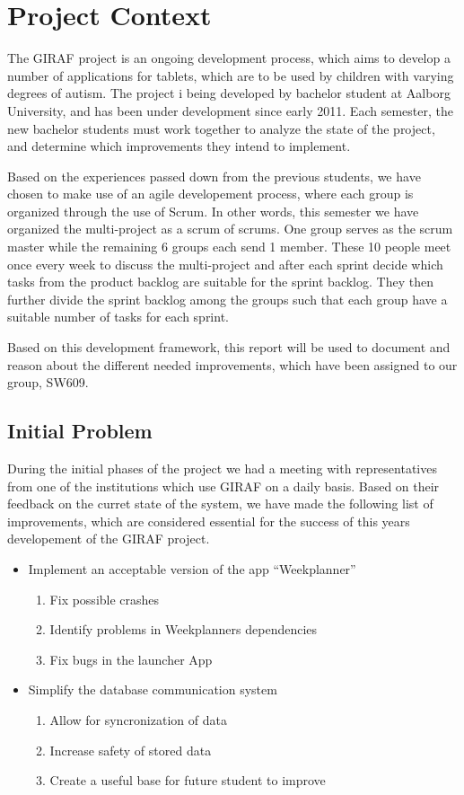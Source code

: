 \chapter{Project Context}
The GIRAF project is an ongoing development process, which aims to develop a
number of applications for tablets, which are to be used by children with
varying degrees of autism. The project i being developed by bachelor student at
Aalborg University, and has been under development since early 2011. Each
semester, the new bachelor students must work together to analyze the state of
the project, and determine which improvements they intend to implement.\nl

Based on the experiences passed down from the previous students, we have chosen
to make use of an agile developement process, where each group is organized
through the use of Scrum. In other words, this semester we have organized the
multi-project as a scrum of scrums. One group serves as the scrum master while
the remaining 6 groups each send 1 member. These 10 people meet once every week
to discuss the multi-project and after each sprint decide which tasks from the
product backlog are suitable for the sprint backlog. They then further divide
the sprint backlog among the groups such that each group have a suitable number
of tasks for each sprint.\nl

Based on this development framework, this report will be used to document and
reason about the different needed improvements, which have been assigned to our
group, SW609.
 
\section{Initial Problem}
During the initial phases of the project we had a meeting with representatives
from one of the institutions which use GIRAF on a daily basis. Based on their
feedback on the curret state of the system, we have made the following list of
improvements, which are considered essential for the success of this years
developement of the GIRAF project.

\begin{itemize}
  \item Implement an acceptable version of the app ``Weekplanner''
  	\begin{enumerate}
  		\item Fix possible crashes
  		\item Identify problems in Weekplanners dependencies
  		\item Fix bugs in the launcher App
	\end{enumerate}
  \item Simplify the database communication system
   	\begin{enumerate}
  		\item Allow for syncronization of data
  		\item Increase safety of stored data
  		\item Create a useful base for future student to improve
	\end{enumerate}
\end{itemize}


